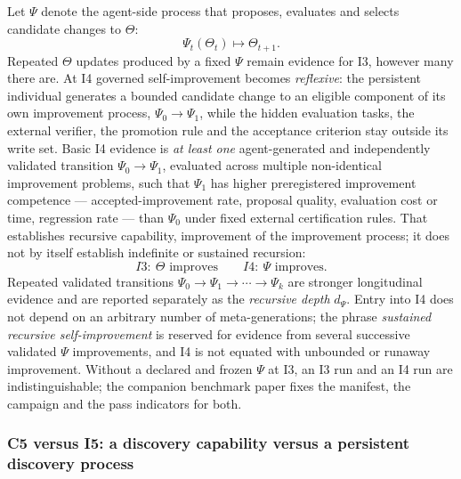 \documentclass[11pt]{article}
\theoremstyle{definition}
\begin{document}
Let $\Psi$ denote the agent-side process that proposes, evaluates and selects candidate changes to $\Theta$:
\begin{equation}
\Psi_t(\Theta_t) \mapsto \Theta_{t+1}.
\end{equation}
Repeated $\Theta$ updates produced by a fixed $\Psi$ remain evidence for I3, however many there are. At I4 governed self-improvement becomes \emph{reflexive}: the persistent individual generates a bounded candidate change to an eligible component of its own improvement process, $\Psi_0 \to \Psi_1$, while the hidden evaluation tasks, the external verifier, the promotion rule and the acceptance criterion stay outside its write set. Basic I4 evidence is \emph{at least one} agent-generated and independently validated transition $\Psi_0 \to \Psi_1$, evaluated across multiple non-identical improvement problems, such that $\Psi_1$ has higher preregistered improvement competence --- accepted-improvement rate, proposal quality, evaluation cost or time, regression rate --- than $\Psi_0$ under fixed external certification rules. That establishes recursive capability, improvement of the improvement process; it does not by itself establish indefinite or sustained recursion:
\begin{equation}
I3:\ \Theta \text{ improves} \qquad I4:\ \Psi \text{ improves}.
\end{equation}
Repeated validated transitions $\Psi_0 \to \Psi_1 \to \cdots \to \Psi_k$ are stronger longitudinal evidence and are reported separately as the \emph{recursive depth} $d_\Psi$. Entry into I4 does not depend on an arbitrary number of meta-generations; the phrase \emph{sustained recursive self-improvement} is reserved for evidence from several successive validated $\Psi$ improvements, and I4 is not equated with unbounded or runaway improvement. Without a declared and frozen $\Psi$ at I3, an I3 run and an I4 run are indistinguishable; the companion benchmark paper fixes the manifest, the campaign and the pass indicators for both.

\subsubsection{C5 versus I5: a discovery capability versus a persistent discovery process}
\end{document}
